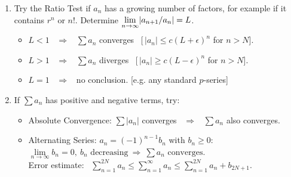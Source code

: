 \documentclass[11pt]{article}
\begin{document}
\begin{enumerate}
\item Try the Ratio Test if $a_n$ has a growing number of factors, for example
if it contains $r^n$ or $n!$.
Determine $\smash{\lim\limits_{n\to\infty}} |a_{n+1}/a_n|=L$.
\begin{itemize}
\item[$\circ$] $L<1$  \ $\Longrightarrow$ \ $\sum a_n$ converges \, 
[\,$|a_n|\leq c(L{+}\epsilon)^n$ for $n>N$].
\item[$\circ$] $L>1$  \ $\Longrightarrow$ \  $\sum a_n$ diverges \, 
 [\,$|a_n|\geq c(L{-}\epsilon)^n$ for $n>N$].
\item[$\circ$] $L=1$  \ $\Longrightarrow$ \   no conclusion. [e.g. any standard $p$-series]
\end{itemize}

\item If $\sum a_n$ has positive and negative terms, try:
\begin{itemize}
\item  Absolute Convergence: $\sum |a_n|$ converges \ $\Longrightarrow$ \   $\sum a_n$ also converges. 
\item Alternating Series: $a_n=(-1)^{n-1} b_n$ with $b_n\geq 0$:
\\[.3em]
$\lim\limits_{n\to\infty} b_n=0,\ \text{$b_n$ decreasing} \ \Longrightarrow \  \sum a_n
\text{ converges. }$
\\[.3em]
Error estimate: \ 
$\sum_{n=1}^{2N} a_n\leq \sum_{n=1}^\infty a_n \leq \sum_{n=1}^{2N} a_n + b_{2N+1}$.
\end{itemize}
\end{enumerate}
\end{document}
